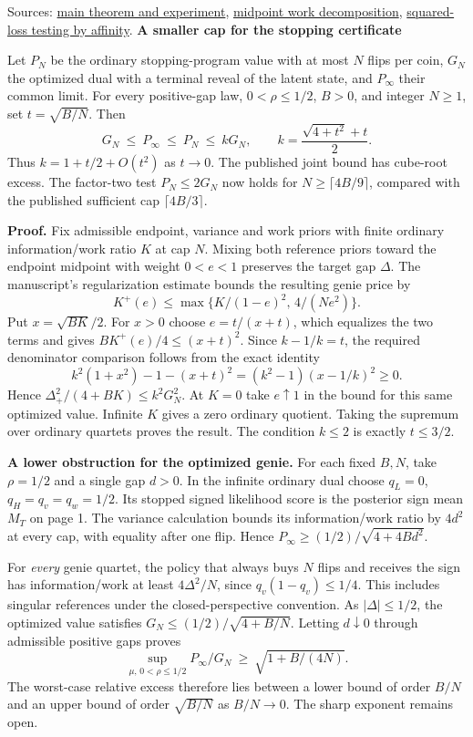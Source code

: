 \documentclass[11pt]{article}
\newcommand{\heading}[1]{{\LARGE\bfseries\color{ink} #1}\par\smallskip}
\newcommand{\src}[2]{\href{https://github.com/davidiach/adaptive-threshold-estimation/blob/97a501383083cc0fa64cb96405444048b8fd4053/#1}{#2}}
\begin{document}
{\small Sources: \src{paper/v6/core.tex}{main theorem and experiment},
\src{paper/v6/appendix-transfer-foundations.tex}{midpoint work decomposition},
\src{paper/v6/appendix-dual.tex}{squared-loss testing by affinity}.}
\newpage
\heading{A smaller cap for the stopping certificate}
Let $P_N$ be the ordinary stopping-program value with at most $N$ flips per coin, $G_N$ the optimized dual with a terminal reveal of the latent state, and $P_\infty$ their common limit. For every positive-gap law, $0<\rho\le1/2$, $B>0$, and integer $N\ge1$, set $t=\sqrt{B/N}$. Then
\[
 G_N\ \le\ P_\infty\ \le\ P_N\ \le\ kG_N,\qquad
 k=\frac{\sqrt{4+t^2}+t}{2}.
\]
Thus $k=1+t/2+O(t^2)$ as $t\to0$. The published joint bound has cube-root excess. The factor-two test $P_N\le2G_N$ now holds for $N\ge\lceil4B/9\rceil$, compared with the published sufficient cap $\lceil4B/3\rceil$.

\textbf{Proof.} Fix admissible endpoint, variance and work priors with finite ordinary information/work ratio $K$ at cap $N$. Mixing both reference priors toward the endpoint midpoint with weight $0<e<1$ preserves the target gap $\Delta$. The manuscript's regularization estimate bounds the resulting genie price by
\[
 K^+(e)\le\max\{K/(1-e)^2,\,4/(Ne^2)\}.
\]
Put $x=\sqrt{BK}/2$. For $x>0$ choose $e=t/(x+t)$, which equalizes the two terms and gives $BK^+(e)/4\le (x+t)^2$. Since $k-1/k=t$, the required denominator comparison follows from the exact identity
\[
 k^2(1+x^2)-1-(x+t)^2=(k^2-1)(x-1/k)^2\ge0.
\]
Hence $\Delta_+^2/(4+BK)\le k^2 G_N^2$. At $K=0$ take $e\uparrow1$ in the bound for this same optimized value. Infinite $K$ gives a zero ordinary quotient. Taking the supremum over ordinary quartets proves the result. The condition $k\le2$ is exactly $t\le3/2$.

\textbf{A lower obstruction for the optimized genie.} For each fixed $B,N$, take $\rho=1/2$ and a single gap $d>0$. In the infinite ordinary dual choose $q_L=0$, $q_H=q_v=q_w=1/2$. Its stopped signed likelihood score is the posterior sign mean $M_T$ on page 1. The variance calculation bounds its information/work ratio by $4d^2$ at every cap, with equality after one flip. Hence $P_\infty\ge (1/2)/\sqrt{4+4Bd^2}$.

For \emph{every} genie quartet, the policy that always buys $N$ flips and receives the sign has information/work at least $4\Delta^2/N$, since $q_v(1-q_v)\le1/4$. This includes singular references under the closed-perspective convention. As $|\Delta|\le1/2$, the optimized value satisfies $G_N\le(1/2)/\sqrt{4+B/N}$. Letting $d\downarrow0$ through admissible positive gaps proves
\[
 \sup_{\mu,\,0<\rho\le1/2} P_\infty/G_N \ \ge\ \sqrt{1+B/(4N)}.
\]
The worst-case relative excess therefore lies between a lower bound of order $B/N$ and an upper bound of order $\sqrt{B/N}$ as $B/N\to0$. The sharp exponent remains open.
\end{document}
